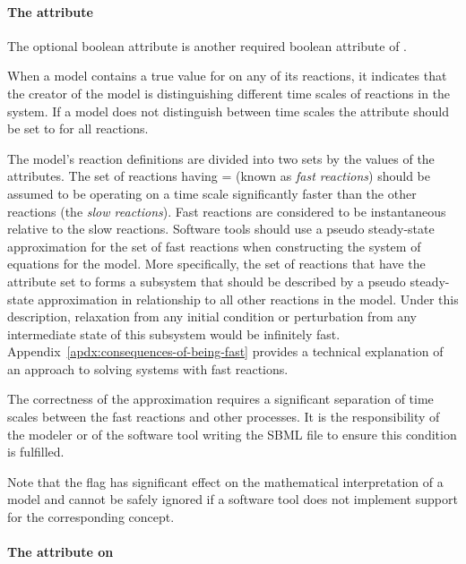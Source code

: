 \paragraph{The  attribute}
\label{sec:fast}

The optional boolean attribute  is another required
boolean attribute of \Reaction.  

When a model contains a true value for  on any of its
reactions, it indicates that the creator of the model is
distinguishing different time scales of reactions in the system.
If a model does not distinguish between time scales the  
attribute should be set to  for all reactions. 

The model's reaction definitions are divided into two sets by the
values of the  attributes.  The set of reactions having
= (known as \emph{fast reactions}) should be
assumed to be operating on a time scale significantly faster than
the other reactions (the \emph{slow reactions}).  Fast reactions
are considered to be instantaneous relative to the slow reactions.
Software tools should use a pseudo steady-state approximation for
the set of fast reactions when constructing the system of
equations for the model.  More specifically, the set of reactions
that have the  attribute set to  forms a
subsystem that should be described by a pseudo steady-state
approximation in relationship to all other reactions in the model.
Under this description, relaxation from any initial condition or
perturbation from any intermediate state of this subsystem would
be infinitely fast.
Appendix~\ref{apdx:consequences-of-being-fast} provides a
technical explanation of an approach to solving systems with fast
reactions.

The correctness of the approximation requires a significant
separation of time scales between the fast reactions and other
processes.  It is the responsibility of the modeler or of the software tool
writing the SBML file to ensure this condition is fulfilled.

Note that the  flag has significant effect on the mathematical
interpretation of a model and cannot be safely ignored if a software 
tool does not implement support for the corresponding concept. 

\paragraph{The  attribute on }
\label{sec:reaction-compartment}

